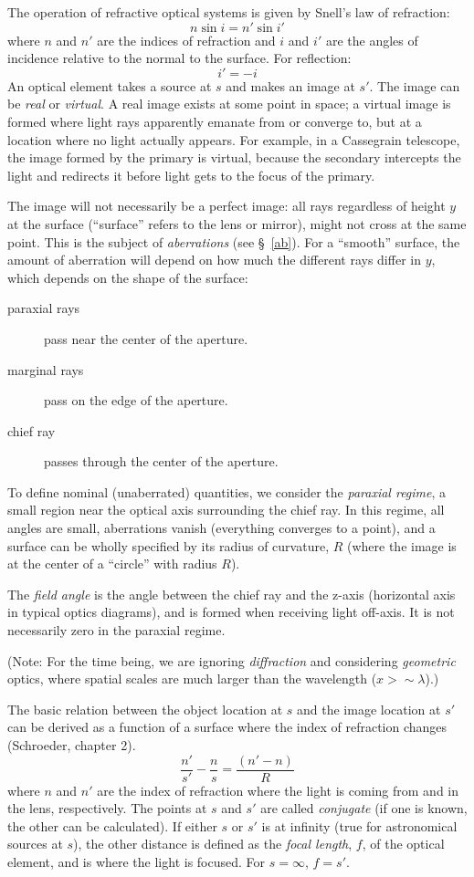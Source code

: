 \documentclass[12pt]{article}
\begin{document}
The operation of refractive optical systems is given by Snell's law
of refraction:
\[
    n\sin{i} = n'\sin{i'}
    \]
where $n$ and $n'$ are the indices of refraction and $i$ and $i'$ are the
angles of incidence relative to the normal to the surface. For
reflection:
\[
    i' = -i
    \]
An optical element takes a source at $s$ and makes an image at $s'$. The image
can be \textit{real} or \textit{virtual}. A real image exists at some point in
space; a virtual image is formed where light rays apparently emanate from or
converge to, but at a location where no light actually appears. For example, in
a Cassegrain telescope, the image formed by the primary is virtual, because the
secondary intercepts the light and redirects it before light gets to the focus
of the primary.

The image will not necessarily be a perfect image: all rays regardless of
height $y$ at the surface (``surface'' refers to the lens or mirror), might not
cross at the same point. This is the subject of \textit{aberrations} (see
\S{}~{\ref{ab}}). For a ``smooth'' surface, the amount of aberration will
depend on how much the different rays differ in $y$, which depends on the shape
of the surface:
\begin{description}
    \item [paraxial rays] pass near the center of the aperture.
    \item [marginal rays] pass on the edge of the aperture.
    \item [chief ray] passes through the center of the aperture.
\end{description}
To define nominal (unaberrated) quantities, we consider the \textit{paraxial
regime}, a small region near the optical axis surrounding the chief ray. In
this regime, all angles are small, aberrations vanish (everything converges to
a point), and a surface can be wholly specified by its radius of curvature, $R$
(where the image is at the center of a ``circle'' with radius $R$).

The \textit{field angle} is the angle between the chief ray and the z-axis
(horizontal axis in typical optics diagrams), and is formed when receiving
light off-axis. It is not necessarily zero in the paraxial regime.

(Note: For the time being, we are ignoring \textit{diffraction} and considering
\textit{geometric} optics, where spatial scales are much larger than the
wavelength ($x > \sim\lambda$).)

The basic relation between the object location at $s$ and the image location at
$s'$ can be derived as a function of a surface where the index of refraction
changes (Schroeder, chapter 2).
\[
    \frac{n'}{s'}-\frac{n}{s} = \frac{(n'-n)}{R}
    \]
where $n$ and $n'$ are the index of refraction where the light is coming from
and in the lens, respectively. The points at $s$ and $s'$ are called
\textit{conjugate} (if one is known, the other can be calculated). If either $s$
or $s'$ is at infinity (true for astronomical sources at $s$), the other
distance is defined as the \textit{focal length}, $f$, of the optical element,
and is where the light is focused. For $s=\infty$, $f=s'$.
\end{document}
